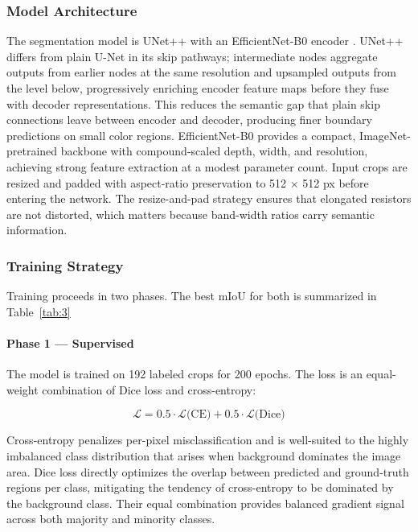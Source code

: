 \documentclass[conference]{IEEEtran}
\begin{document}
\subsubsection{Model Architecture}
The segmentation model is UNet++ \cite{zhou2020unetredesigningskipconnections} with an EfficientNet-B0 encoder \cite{tan2019efficientnet}. UNet++ differs from plain U-Net in its skip pathways; intermediate nodes aggregate outputs from earlier nodes at the same resolution and upsampled outputs from the level below, progressively enriching encoder feature maps before they fuse with decoder representations. This reduces the semantic gap that plain skip connections leave between encoder and decoder, producing finer boundary predictions on small color regions. EfficientNet-B0 provides a compact, ImageNet-pretrained backbone with compound-scaled depth, width, and resolution, achieving strong feature extraction at a modest parameter count. Input crops are resized and padded with aspect-ratio preservation to 512 × 512 px before entering the network. The
resize-and-pad strategy ensures that elongated resistors are not distorted, which matters because band-width ratios carry semantic information.


\subsubsection{Training Strategy}
Training proceeds in two phases. The best mIoU for both is summarized in Table~\ref{tab:3}

\paragraph{Phase 1 — Supervised} The model is trained on 192 labeled crops for 200 epochs. The loss is an equal-weight combination of Dice loss and cross-entropy:

\begin{equation}
\mathcal{L} = 0.5 \cdot \mathcal{L}({\mathrm{CE})} + 0.5 \cdot \mathcal{L}({\mathrm{Dice})}
\end{equation}

Cross-entropy penalizes per-pixel misclassification and is well-suited to the highly imbalanced class distribution that arises when background dominates the image area. Dice loss directly optimizes the overlap between predicted and ground-truth regions per class, mitigating the tendency of cross-entropy to be dominated by the background class. Their equal combination provides balanced gradient signal across both majority and minority classes. 
\end{document}
